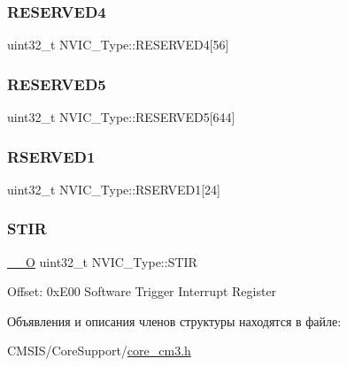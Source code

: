 \subsubsection{\texorpdfstring{RESERVED4}{RESERVED4}}
{\footnotesize\ttfamily uint32\+\_\+t N\+V\+I\+C\+\_\+\+Type\+::\+R\+E\+S\+E\+R\+V\+E\+D4\mbox{[}56\mbox{]}}

\mbox{\label{struct_n_v_i_c___type_a4f753b4f824270175af045ac99bc12e8}} 
\subsubsection{\texorpdfstring{RESERVED5}{RESERVED5}}
{\footnotesize\ttfamily uint32\+\_\+t N\+V\+I\+C\+\_\+\+Type\+::\+R\+E\+S\+E\+R\+V\+E\+D5\mbox{[}644\mbox{]}}

\mbox{\label{struct_n_v_i_c___type_a6d1daf7ab6f2ba83f57ff67ae6f571fe}} 
\subsubsection{\texorpdfstring{RSERVED1}{RSERVED1}}
{\footnotesize\ttfamily uint32\+\_\+t N\+V\+I\+C\+\_\+\+Type\+::\+R\+S\+E\+R\+V\+E\+D1\mbox{[}24\mbox{]}}

\mbox{\label{struct_n_v_i_c___type_a0b0d7f3131da89c659a2580249432749}} 
\subsubsection{\texorpdfstring{STIR}{STIR}}
{\footnotesize\ttfamily \mbox{\hyperlink{group___c_m_s_i_s___c_m3__core__definitions_ga7e25d9380f9ef903923964322e71f2f6}{\+\_\+\+\_\+O}} uint32\+\_\+t N\+V\+I\+C\+\_\+\+Type\+::\+S\+T\+IR}

Offset\+: 0x\+E00 Software Trigger Interrupt Register ~\newline
 

Объявления и описания членов структуры находятся в файле\+:\begin{DoxyCompactItemize}
\item 
C\+M\+S\+I\+S/\+Core\+Support/\mbox{\hyperlink{core__cm3_8h}{core\+\_\+cm3.\+h}}\end{DoxyCompactItemize}
